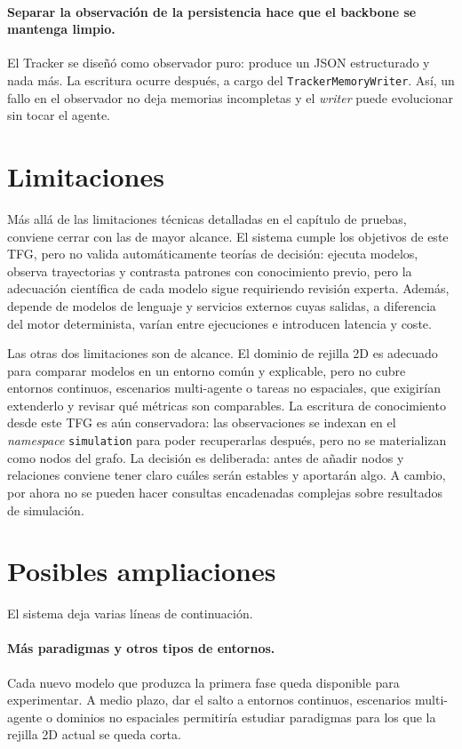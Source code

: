\paragraph{Separar la observación de la persistencia hace que el
backbone se mantenga limpio.} El Tracker se diseñó como observador puro: produce
un JSON estructurado y nada más. La escritura ocurre después, a cargo del
\texttt{TrackerMemoryWriter}. Así, un fallo en el observador no deja memorias
incompletas y el \emph{writer} puede evolucionar sin tocar el agente.

\section{Limitaciones}

Más allá de las limitaciones técnicas detalladas en el capítulo de pruebas,
conviene cerrar con las de mayor alcance. El sistema cumple los objetivos de
este TFG, pero no valida automáticamente teorías de decisión: ejecuta modelos,
observa trayectorias y contrasta patrones con conocimiento previo, pero la
adecuación científica de cada modelo sigue requiriendo revisión experta. Además,
depende de modelos de lenguaje y servicios externos cuyas salidas, a diferencia
del motor determinista, varían entre ejecuciones e introducen latencia y coste.

Las otras dos limitaciones son de alcance. El dominio de rejilla 2D es adecuado
para comparar modelos en un entorno común y explicable, pero no cubre entornos
continuos, escenarios multi-agente o tareas no espaciales, que exigirían
extenderlo y revisar qué métricas son comparables. La escritura de
conocimiento desde este TFG es aún conservadora: las observaciones se
indexan en el \textit{namespace} \texttt{simulation} para poder recuperarlas
después, pero no se materializan como nodos del grafo. La decisión es
deliberada: antes de añadir nodos y relaciones conviene tener claro cuáles
serán estables y aportarán algo. A cambio, por ahora no se pueden hacer
consultas encadenadas complejas sobre resultados de simulación.

\section{Posibles ampliaciones}

El sistema deja varias líneas de continuación.

\paragraph{Más paradigmas y otros tipos de entornos.} Cada nuevo modelo
que produzca la primera fase queda disponible para experimentar. A medio plazo,
dar el salto a entornos continuos, escenarios multi-agente o dominios no
espaciales permitiría estudiar paradigmas para los que la rejilla 2D actual se
queda corta.

